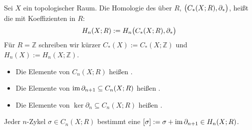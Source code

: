 \begin{definition}[{name=[{Singuläre Homologie von $X$}]}]
	Sei $X$ ein topologischer Raum. 
	Die Homologie des  über $R$, $\enbrace[\big]{C_*(X;R), \partial_*}$, heißt die  mit Koeffizienten in $R$:
	\[
		H_n(X;R) := H_n \enbrace[\big]{C_*(X;R), \partial_*} 
	\]  
	Für $R=\mathbb{Z}$ schreiben wir kürzer $C_*(X) := C_*(X;\mathbb{Z})$ und $H_n(X) := H_n(X;\mathbb{Z})$.
	\begin{itemize}
		\item Die Elemente von $C_n(X;R)$ heißen .
		\item Die Elemente von $\im \partial_{n+1} \subseteq C_n(X;R)$ heißen .
		\item Die Elemente von $\ker \partial_{n} \subseteq C_n(X;R)$ heißen .
	\end{itemize}
	Jeder $n$-Zykel $\sigma \in C_n(X;R)$ bestimmt eine  $[\sigma] := \sigma + \im \partial_{n+1} \in H_n(X;R)$.
\end{definition}

